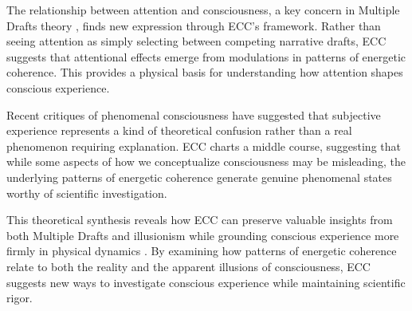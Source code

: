 The relationship between attention and consciousness, a key concern in Multiple Drafts theory \cite{VanGulick2018}, finds new expression through ECC's framework. Rather than seeing attention as simply selecting between competing narrative drafts, ECC suggests that attentional effects emerge from modulations in patterns of energetic coherence. This provides a physical basis for understanding how attention shapes conscious experience.

Recent critiques of phenomenal consciousness \cite{Frankish2016} have suggested that subjective experience represents a kind of theoretical confusion rather than a real phenomenon requiring explanation. ECC charts a middle course, suggesting that while some aspects of how we conceptualize consciousness may be misleading, the underlying patterns of energetic coherence generate genuine phenomenal states worthy of scientific investigation.

This theoretical synthesis reveals how ECC can preserve valuable insights from both Multiple Drafts and illusionism while grounding conscious experience more firmly in physical dynamics \cite{Dennett1991}. By examining how patterns of energetic coherence relate to both the reality and the apparent illusions of consciousness, ECC suggests new ways to investigate conscious experience while maintaining scientific rigor.